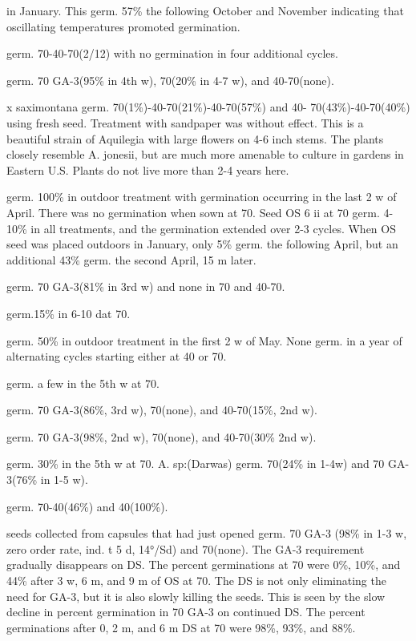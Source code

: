\begin{description}
in January. This germ. 57\% the following October and November indicating that
oscillating temperatures promoted germination.
\item[A. fragrans] germ. 70-40-70(2/12) with no germination in four additional cycles.
\item[A. jonesii] germ. 70 GA-3(95\% in 4th w), 70(20\% in 4-7 w), and 40-70(none).
\item[A. jonesii] x saximontana germ. 70(1\%)-40-70(21\%)-40-70(57\%) and 40-
70(43\%)-40-70(40\%) using fresh seed. Treatment with sandpaper was without effect.
This is a beautiful strain of Aquilegia with large flowers on 4-6 inch stems. The plants
closely resemble A. jonesii, but are much more amenable to culture in gardens in
Eastern U.S. Plants do not live more than 2-4 years here.
\item[A. jucunda] germ. 100\% in outdoor treatment with germination occurring in the
last 2 w of April. There was no germination when sown at 70. Seed OS 6 ii at 70
germ. 4-10\% in all treatments, and the germination extended over 2-3 cycles. When
OS seed was placed outdoors in January, only 5\% germ. the following April, but an
additional 43\% germ. the second April, 15 m later.

\item[A. laramiensis] germ. 70 GA-3(81\% in 3rd w) and none in 70 and 40-70.
\item[A. micrantha] germ.15\% in 6-10 dat 70.
\item[A. olympica] germ. 50\% in outdoor treatment in the first 2 w of May. None germ.
in a year of alternating cycles starting either at 40 or 70.
\item[A. pyrenaica] germ. a few in the 5th w at 70.
\item[A. saximontana] germ. 70 GA-3(86\%, 3rd w), 70(none), and 40-70(15\%, 2nd w).
\item[A. scopulorum] germ. 70 GA-3(98\%, 2nd w), 70(none), and 40-70(30\% 2nd w).
\item[A. skinned] germ. 30\% in the 5th w at 70.
A. sp:(Darwas) germ. 70(24\% in 1-4w) and 70 GA-3(76\% in 1-5 w).
\item[A. tridentata] germ. 70-40(46\%) and 40(100\%).
\item[A. vulgaris] seeds collected from capsules that had just opened germ. 70 GA-3
(98\% in 1-3 w, zero order rate, ind. t 5 d, 14°/Sd) and 70(none). The GA-3 requirement
gradually disappears on DS. The percent germinations at 70 were 0\%, 10\%, and 44\%
after 3 w, 6 m, and 9 m of OS at 70. The DS is not only eliminating the need for GA-3,
but it is also slowly killing the seeds. This is seen by the slow decline in percent
germination in 70 GA-3 on continued DS. The percent germinations after 0, 2 m, and
6 m DS at 70 were 98\%, 93\%, and 88\%.


\end{description}
